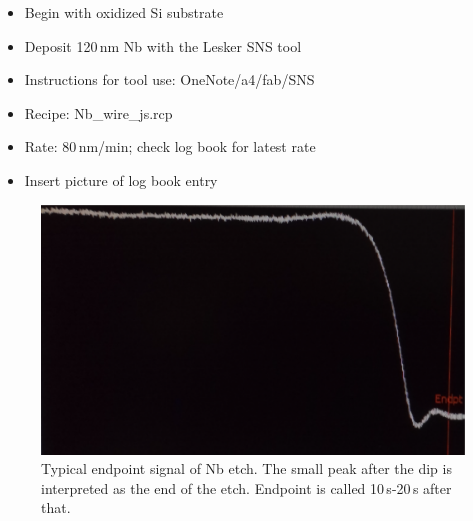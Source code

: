 \begin{itemize}
\item Begin with oxidized Si substrate
\item Deposit 120\,nm Nb with the Lesker SNS tool
\item Instructions for tool use: OneNote/a4/fab/SNS
\item Recipe: Nb\_wire\_js.rcp
\item Rate: 80\,nm/min; check log book for latest rate
\item Insert picture of log book entry
\end{itemize}


\begin{figure}[!h]
\centering
\includegraphics[width=14cm]{figures/plasmatherm_Nb_sloped_endpoint.png}
\caption{\label{fig:plasmatherm_Nb_sloped_endpoint}Typical endpoint signal of Nb etch. The small peak after the dip is interpreted as the end of the etch. Endpoint is called 10\,s-20\,s after that.}
\end{figure}

